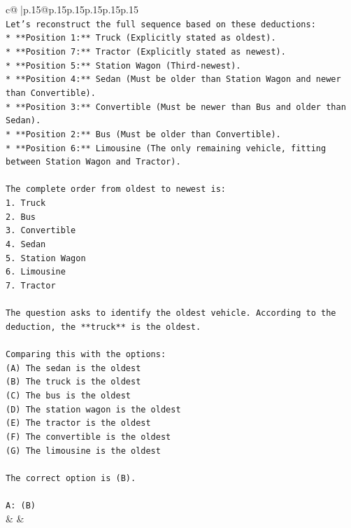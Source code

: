 \documentclass{article}
\begin{document}
{\begin{supertabular}{c@{$\;$}|p{.15\linewidth}@{}p{.15\linewidth}p{.15\linewidth}p{.15\linewidth}p{.15\linewidth}p{.15\linewidth}}
{{{\\ 
\texttt{Let's reconstruct the full sequence based on these deductions:} \\
\texttt{*   **Position 1:** Truck (Explicitly stated as oldest).} \\
\texttt{*   **Position 7:** Tractor (Explicitly stated as newest).} \\
\texttt{*   **Position 5:** Station Wagon (Third{-}newest).} \\
\texttt{*   **Position 4:** Sedan (Must be older than Station Wagon and newer than Convertible).} \\
\texttt{*   **Position 3:** Convertible (Must be newer than Bus and older than Sedan).} \\
\texttt{*   **Position 2:** Bus (Must be older than Convertible).} \\
\texttt{*   **Position 6:** Limousine (The only remaining vehicle, fitting between Station Wagon and Tractor).} \\
\\ 
\texttt{The complete order from oldest to newest is:} \\
\texttt{1.  Truck} \\
\texttt{2.  Bus} \\
\texttt{3.  Convertible} \\
\texttt{4.  Sedan} \\
\texttt{5.  Station Wagon} \\
\texttt{6.  Limousine} \\
\texttt{7.  Tractor} \\
\\ 
\texttt{The question asks to identify the oldest vehicle. According to the deduction, the **truck** is the oldest.} \\
\\ 
\texttt{Comparing this with the options:} \\
\texttt{(A) The sedan is the oldest} \\
\texttt{(B) The truck is the oldest} \\
\texttt{(C) The bus is the oldest} \\
\texttt{(D) The station wagon is the oldest} \\
\texttt{(E) The tractor is the oldest} \\
\texttt{(F) The convertible is the oldest} \\
\texttt{(G) The limousine is the oldest} \\
\\ 
\texttt{The correct option is (B).} \\
\\ 
\texttt{A: (B)} \\
            }
        }
    }
    & & \\ \\


\end{supertabular}}
\end{document}
